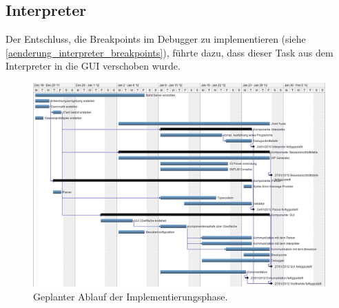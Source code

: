 \subsection{Interpreter}
Der Entschluss, die Breakpoints im Debugger zu implementieren (siehe \ref{aenderung_interpreter_breakpoints}), führte dazu, dass dieser Task aus dem Interpreter in die GUI verschoben wurde.

\begin{landscape}%
	\begin{figure}%
		\vspace{-2cm}
		\includegraphics[height=1.2\textheight]{images/gantt_implementierung_diag.png}%
		\caption{Geplanter Ablauf der Implementierungsphase.}%
	\end{figure}%
\end{landscape}
